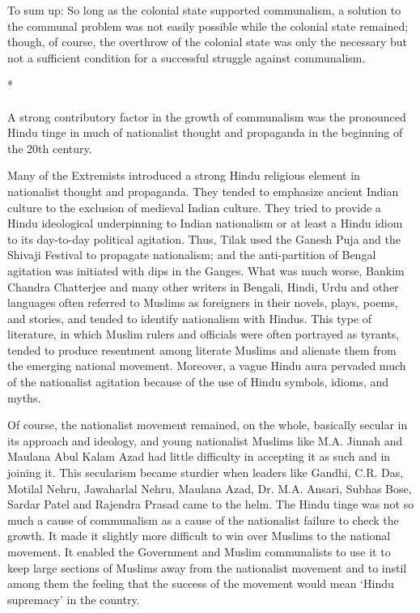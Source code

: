 \begin{multicols}{2}
To sum up: So long as the colonial state supported communalism, a solution to the communal problem was not easily possible while the colonial state remained; though, of course, the overthrow of the colonial state was only the necessary but not a sufficient condition for a successful struggle against communalism.

\begin{center}*\end{center}

\paragraph*{}

A strong contributory factor in the growth of communalism was the pronounced Hindu tinge in much of nationalist thought and propaganda in the beginning of the 20th century.

Many of the Extremists introduced a strong Hindu religious element in nationalist thought and propaganda. They tended to emphasize ancient Indian culture to the exclusion of medieval Indian culture. They tried to provide a Hindu ideological underpinning to Indian nationalism or at least a Hindu idiom to its day-to-day political agitation. Thus, Tilak used the Ganesh Puja and the Shivaji Festival to propagate nationalism; and the anti-partition of Bengal agitation was initiated with dips in the Ganges. What was much worse, Bankim Chandra Chatterjee and many other writers in Bengali, Hindi, Urdu and other languages often referred to Muslims as foreigners in their novels, plays, poems, and stories, and tended to identify nationalism with Hindus. This type of literature, in which Muslim rulers and officials were often portrayed as tyrants, tended to produce resentment among literate Muslims and alienate them from the emerging national movement. Moreover, a vague Hindu aura pervaded much of the nationalist agitation because of the use of Hindu symbols, idioms, and myths.

Of course, the nationalist movement remained, on the whole, basically secular in its approach and ideology, and young nationalist Muslims like M.A. Jinnah and Maulana Abul Kalam Azad had little difficulty in accepting it as such and in joining it. This secularism became sturdier when leaders like Gandhi, C.R. Das, Motilal Nehru, Jawaharlal Nehru, Maulana Azad, Dr. M.A. Ansari, Subhas Bose, Sardar Patel and Rajendra Prasad came to the helm. The Hindu tinge was not so much a cause of communalism as a cause of the nationalist failure to check the growth. It made it slightly more difficult to win over Muslims to the national movement. It enabled the Government and Muslim communalists to use it to keep large sections of Muslims away from the nationalist movement and to instil among them the feeling that the success of the movement would mean `Hindu supremacy' in the country.


\end{multicols}
